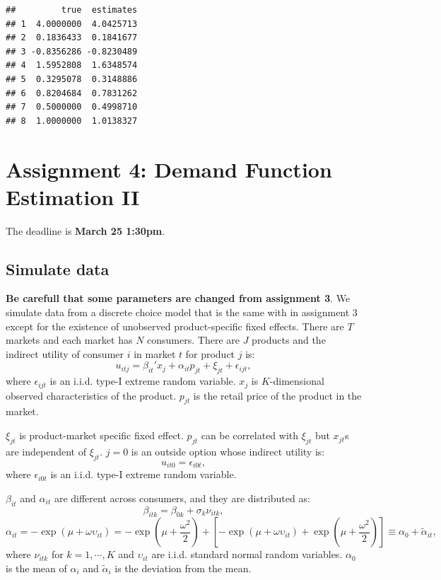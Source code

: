 \documentclass[]{book}
\begin{document}
\begin{verbatim}
##         true  estimates
## 1  4.0000000  4.0425713
## 2  0.1836433  0.1841677
## 3 -0.8356286 -0.8230489
## 4  1.5952808  1.6348574
## 5  0.3295078  0.3148886
## 6  0.8204684  0.7831262
## 7  0.5000000  0.4998710
## 8  1.0000000  1.0138327
\end{verbatim}

\chapter{Assignment 4: Demand Function Estimation II}\label{assignment4}

The deadline is \textbf{March 25 1:30pm}.

\section{Simulate data}\label{simulate-data-3}

\textbf{Be carefull that some parameters are changed from assignment 3}.
We simulate data from a discrete choice model that is the same with in
assignment 3 except for the existence of unobserved product-specific
fixed effects. There are \(T\) markets and each market has \(N\)
consumers. There are \(J\) products and the indirect utility of consumer
\(i\) in market \(t\) for product \(j\) is: \[
u_{itj} = \beta_{it}' x_j + \alpha_{it} p_{jt} + \xi_{jt} + \epsilon_{ijt},
\] where \(\epsilon_{ijt}\) is an i.i.d. type-I extreme random variable.
\(x_j\) is \(K\)-dimensional observed characteristics of the product.
\(p_{jt}\) is the retail price of the product in the market.

\(\xi_{jt}\) is product-market specific fixed effect. \(p_{jt}\) can be
correlated with \(\xi_{jt}\) but \(x_{jt}\)s are independent of
\(\xi_{jt}\). \(j = 0\) is an outside option whose indirect utility is:
\[
u_{it0} = \epsilon_{i0t},
\] where \(\epsilon_{i0t}\) is an i.i.d. type-I extreme random variable.

\(\beta_{it}\) and \(\alpha_{it}\) are different across consumers, and
they are distributed as: \[
\beta_{itk} = \beta_{0k} + \sigma_k \nu_{itk},
\] \[
\alpha_{it} = - \exp(\mu + \omega \upsilon_{it}) = - \exp(\mu + \frac{\omega^2}{2}) + [- \exp(\mu + \omega \upsilon_{it}) + \exp(\mu + \frac{\omega^2}{2})] \equiv \alpha_0 + \tilde{\alpha}_{it},
\] where \(\nu_{itk}\) for \(k = 1, \cdots, K\) and \(\upsilon_{it}\)
are i.i.d. standard normal random variables. \(\alpha_0\) is the mean of
\(\alpha_i\) and \(\tilde{\alpha}_i\) is the deviation from the mean.
\end{document}
